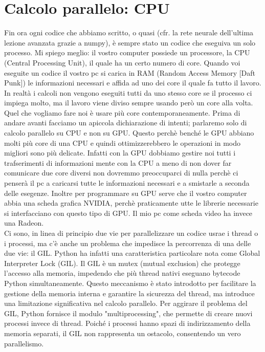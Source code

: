 \documentclass[10pt,a4paper]{article}
\begin{document}
\section{Calcolo parallelo: CPU}
Fin ora ogni codice che abbiamo scritto, o quasi (cfr. la rete neurale dell'ultima lezione avanzata grazie a numpy), è sempre stato un codice che eseguiva un solo processo. Mi spiego meglio: il vostro computer possiede un processore, la CPU (Central Processing Unit), il quale ha un certo numero di core. Quando voi eseguite un codice il vostro pc si carica in RAM (Random Access Memory [Daft Punk]) le informazioni necessari e affida ad uno dei core il quale fa tutto il lavoro. In realtà i calcoli non vengono eseguiti tutti da uno stesso core se il processo ci impiega molto, ma il lavoro viene diviso sempre usando però un core alla volta. Quel che vogliamo fare noi è usare più core contemporaneamente. Prima di andare avanti facciamo un apiccola dichiarazione di intenti; parlaremo solo di calcolo parallelo su CPU e non su GPU. Questo perchè benché le GPU abbiano molti più core di una CPU e quindi ottimizzerebbero le operazioni in modo migliori sono più delicate. Infatti con la GPU dobbiamo gestire noi tutti i trafserimenti di informazioni mente con la CPU a meno di non dover far comunicare due core diversi non dovremmo preoccuparci di nulla perchè ci penserà il pc a caricarsi tutte le informazioni necessari e a smistarle a seconda delle esegenze. Inoltre per programmare su GPU serve che il vostro computer abbia una scheda grafica NVIDIA, perchè praticamente utte le librerie necessarie si interfacciano con questo tipo di GPU. Il mio pc come scheda video ha invece una Radeon.\\
Ci sono, in linea di principio due vie per parallelizzare un codice usrae i thread o i processi, ma c'è anche un problema che impedisce la percorrenza di una delle due vie: il GIL. Python ha infatti una caratteristica particolare nota come Global Interpreter Lock (GIL). Il GIL è un mutex (mutual exclusion) che protegge l'accesso alla memoria, impedendo che più thread nativi eseguano bytecode Python simultaneamente. Questo meccanismo è stato introdotto per facilitare la gestione della memoria interna e garantire la sicurezza del thread, ma introduce una limitazione significativa nel calcolo parallelo. Per aggirare il problema del GIL, Python fornisce il modulo "multiprocessing", che permette di creare nuovi processi invece di thread. Poiché i processi hanno spazi di indirizzamento della memoria separati, il GIL non rappresenta un ostacolo, consentendo un vero parallelismo.
\end{document}
